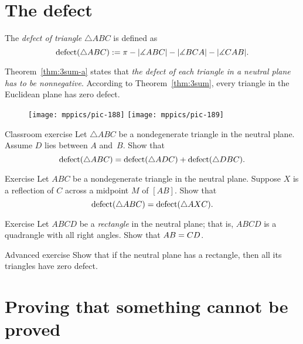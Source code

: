 \section{The defect}\label{The defect}

The \emph{defect of triangle} $\triangle ABC$ is defined as 
$$\mathop{\rm defect}\nolimits(\triangle ABC)
:= 
\pi-|\measuredangle ABC|-|\measuredangle BCA|-|\measuredangle CAB|.$$

Theorem~\ref{thm:3sum-a} states that \textit{the defect of each triangle in a neutral plane has to be nonnegative}.
According to Theorem~\ref{thm:3sum}, every triangle in
the Euclidean plane has zero defect.

{

\begin{wrapfigure}{o}{24mm}
\vskip-6mm
\centering
\texttt{[image: mppics/pic-188]}
\vskip4mm
\texttt{[image: mppics/pic-189]}
\end{wrapfigure}

\begin{thm}{Classroom exercise}\label{ex:defect}
Let $\triangle ABC$ be a nondegenerate triangle in the neutral plane.
Assume $D$ lies between $A$ and~$B$.
Show that 
$$\mathop{\rm defect}\nolimits(\triangle ABC)=\mathop{\rm defect}\nolimits(\triangle ADC)+\mathop{\rm defect}\nolimits(\triangle DBC).$$

\end{thm}


\begin{thm}{Exercise}\label{ex:defect=} Let $ABC$ be a nondegenerate triangle in the neutral plane.
Suppose $X$ is a reflection of $C$ across a midpoint $M$ of $[AB]$.
Show that 
$$\mathop{\rm defect}\nolimits(\triangle ABC)=\mathop{\rm defect}\nolimits(\triangle AXC).$$
\end{thm}

}

\vskip-2mm

\begin{thm}{Exercise}\label{ex:neutral-rectangle}
Let $ABCD$ be a \emph{rectangle} in the neutral plane;
that is, $ABCD$ is a quadrangle with all right angles.
Show that $AB=CD$. 
\end{thm}

\begin{thm}{Advanced exercise}\label{ex:neutral-rectangle+}
Show that if the neutral plane has a rectangle, then all its triangles have zero defect.
\end{thm}

\section{Proving that something cannot be proved}
\label{sec:unprovable}

